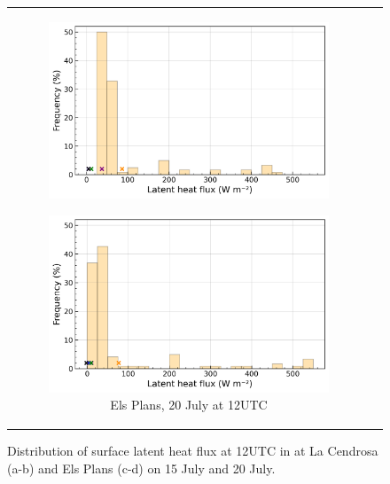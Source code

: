 \begin{figure}[hbtp]
{\begin{tabular}{cc}
\begin{subfigure}[t]{0.48\textwidth}
            \includegraphics[width=\textwidth]{images/chap6/IOP_bins/bins_flat_2021-07-15T12:00:00_elsplans.png}
        \end{subfigure}
        \begin{subfigure}[t]{0.48\textwidth}
            \caption{Els Plans, 20 July at 12UTC}
            \includegraphics[width=\textwidth]{images/chap6/IOP_bins/bins_flat_2021-07-20T12:00:00_elsplans.png}
        \end{subfigure}
    \end{tabular}
    }
    \caption{Distribution of surface latent heat flux at 12UTC in \mesomean at La Cendrosa (a-b) and Els Plans (c-d) on 15 July and 20 July.}
    \label{fig:flat_bins}
\end{figure}

